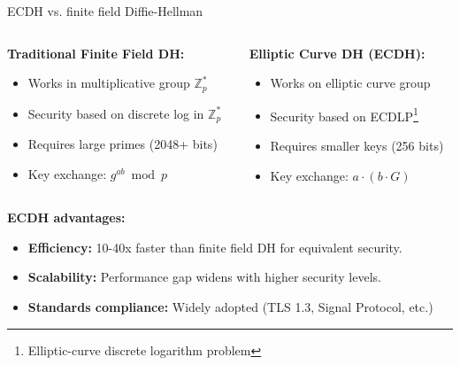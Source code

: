\documentclass[aspectratio=169, lualatex, handout]{beamer}
\begin{document}
\begin{frame}{ECDH vs. finite field Diffie-Hellman}
	\begin{columns}
		\begin{column}{0.5\textwidth}
			\textbf{Traditional Finite Field DH:}
			\begin{itemize}[<+->]
				\item Works in multiplicative group $\mathbb{Z}_p^*$
				\item Security based on discrete log in $\mathbb{Z}_p^*$
				\item Requires large primes (2048+ bits)
				\item Key exchange: $g^{ab} \bmod p$
			\end{itemize}
		\end{column}
		\begin{column}{0.5\textwidth}
			\textbf{Elliptic Curve DH (ECDH):}
			\begin{itemize}[<+->]
				\item Works on elliptic curve group
				\item Security based on ECDLP\footnote{Elliptic-curve discrete logarithm problem}
				\item Requires smaller keys (256 bits)
				\item Key exchange: $a \cdot (b \cdot G)$
			\end{itemize}
		\end{column}
	\end{columns}
	\vspace{0.5cm}
	\textbf{ECDH advantages:}
	\begin{itemize}
		\item \textbf{Efficiency:} 10-40x faster than finite field DH for equivalent security.
		\item \textbf{Scalability:} Performance gap widens with higher security levels.
		\item \textbf{Standards compliance:} Widely adopted (TLS 1.3, Signal Protocol, etc.)
	\end{itemize}
\end{frame}
\end{document}
